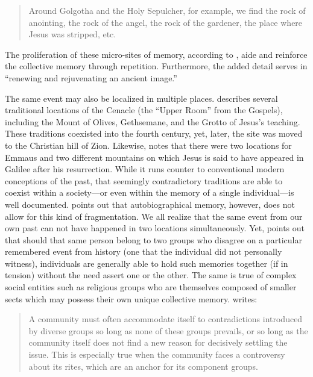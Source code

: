 \begin{quote} Around Golgotha and the Holy Sepulcher, for example, we find the rock of anointing, the rock of the angel, the rock of the gardener, the place where Jesus was stripped, etc.\autocite[220]{halbwachs1992} \end{quote}  

The proliferation of these micro-sites of memory, according to \halbwachs, aide and reinforce the collective memory through repetition. Furthermore, the added detail serves in ``renewing and rejuvenating an ancient image.''\autocite[220]{halbwachs1992}  

The same event may also be localized in multiple places. \halbwachs describes several traditional locations of the Cenacle (the ``Upper Room'' from the Gospels), including the Mount of Olives, Gethsemane, and the Grotto of Jesus's teaching. These traditions coexisted into the fourth century, yet, later, the site was moved to the Christian hill of Zion. Likewise, \halbwachs notes that there were two locations for Emmaus and two different mountains on which Jesus is said to have appeared in Galilee after his resurrection. While it runs counter to conventional modern conceptions of the past, that seemingly contradictory traditions are able to coexist within a society---or even within the memory of a single individual---is well documented.
\halbwachs points out that autobiographical memory, however, does not allow for this kind of fragmentation.
%
We all realize that the same event from our own past can not have happened in two locations simultaneously. Yet, \halbwachs points out that should that same person belong to two groups who disagree on a particular remembered event from history (one that the individual did not personally witness), individuals are generally able to hold such memories together (if in tension) without the need assert one or the other. The same is true of complex social entities such as religious groups who are themselves composed of smaller sects which may possess their own unique collective memory. \halbwachs writes:  

\begin{quote} A community must often accommodate itself to contradictions introduced by diverse groups so long as none of these groups prevails, or so long as the community itself does not find a new reason for decisively settling the issue. This is especially true when the community faces a controversy about its rites, which are an anchor for its component groups.\autocite[224]{halbwachs1992} \end{quote} 

